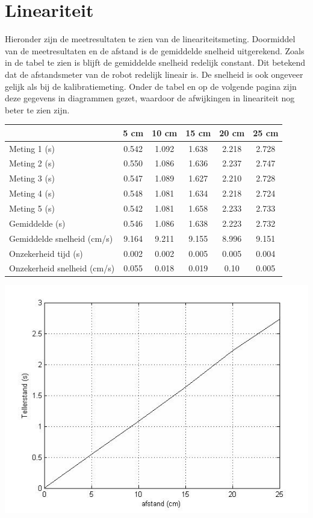 \documentclass{thema}
\begin{document}
\section{Lineariteit}
Hieronder zijn de meetresultaten te zien van de lineariteitsmeting. Doormiddel van de meetresultaten en de afstand is de gemiddelde snelheid uitgerekend. Zoals in de tabel te zien is blijft de gemiddelde snelheid redelijk constant. Dit betekend dat de afstandsmeter van de robot redelijk lineair is. De snelheid is ook ongeveer gelijk als bij de kalibratiemeting. Onder de tabel en op de volgende pagina zijn deze gegevens in diagrammen gezet, waardoor de afwijkingen in lineariteit nog beter te zien zijn. 
\begin{center}
\begin{tabular}{| l| c| c| c| c| c|}
\hline
   & 5 cm & 10 cm & 15 cm & 20 cm & 25 cm\\
\hline
   Meting 1 (s) & 0.542 & 1.092 & 1.638 & 2.218 & 2.728 \\
\hline
   Meting 2 (s) & 0.550 & 1.086 & 1.636 & 2.237 & 2.747 \\
\hline
   Meting 3 (s) & 0.547 & 1.089 & 1.627 & 2.210 & 2.728 \\
\hline
   Meting 4 (s) & 0.548 & 1.081 & 1.634 & 2.218 & 2.724 \\
\hline
   Meting 5 (s) & 0.542 & 1.081 & 1.658 & 2.233 & 2.733 \\
\hline
   Gemiddelde (s) & 0.546 & 1.086 & 1.638 & 2.223 & 2.732 \\
\hline
   Gemiddelde snelheid (cm/s) & 9.164 & 9.211 & 9.155 & 8.996 & 9.151 \\
\hline
   Onzekerheid tijd (s) & 0.002 & 0.002 & 0.005 & 0.005 & 0.004 \\
\hline
   Onzekerheid snelheid (cm/s) & 0.055 & 0.018 & 0.019 & 0.10 & 0.005 \\
\hline
 \end{tabular}
\end{center}
\begin{center}
\includegraphics[width=150mm] {afstand-tellerstand.jpg}
\end{center}
\end{document}
